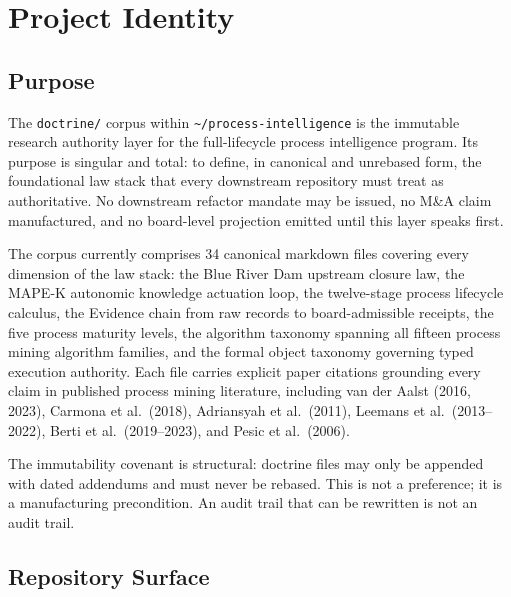 \section{Project Identity}
\label{sec:doctrine-identity}

\subsection{Purpose}
\label{sec:doctrine-identity-purpose}

The \texttt{doctrine/} corpus within \texttt{\textasciitilde/process-intelligence} is the immutable
research authority layer for the full-lifecycle process intelligence program. Its purpose is
singular and total: to define, in canonical and unrebased form, the foundational law stack
that every downstream repository must treat as authoritative. No downstream refactor mandate
may be issued, no M\&A claim manufactured, and no board-level projection emitted until this
layer speaks first.

The corpus currently comprises 34 canonical markdown files covering every dimension of the
law stack: the Blue River Dam upstream closure law, the MAPE-K autonomic knowledge actuation
loop, the twelve-stage process lifecycle calculus, the Evidence chain from raw records to
board-admissible receipts, the five process maturity levels, the algorithm taxonomy spanning
all fifteen process mining algorithm families, and the formal object taxonomy governing typed
execution authority. Each file carries explicit paper citations grounding every claim in
published process mining literature, including van der Aalst (2016, 2023), Carmona et al.\
(2018), Adriansyah et al.\ (2011), Leemans et al.\ (2013--2022), Berti et al.\ (2019--2023),
and Pesic et al.\ (2006).

The immutability covenant is structural: doctrine files may only be appended with dated
addendums and must never be rebased. This is not a preference; it is a manufacturing
precondition. An audit trail that can be rewritten is not an audit trail.

\subsection{Repository Surface}
\label{sec:doctrine-identity-surface}


